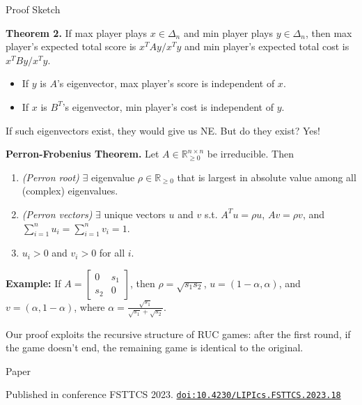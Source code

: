 \documentclass[final,20pt]{beamer}
\newlength{\colwidth}
\begin{document}
\begin{frame}[t]
\begin{columns}[t]
\begin{column}{\colwidth}
\begin{block}{Proof Sketch}


\textbf{Theorem 2.}
If max player plays $x \in \Delta_n$ and min player plays $y \in \Delta_n$,
then max player's expected total score is $x^TAy/x^Ty$
and min player's expected total cost is $x^TBy/x^Ty$.

\begin{itemize}
\item If $y$ is $A$'s eigenvector, max player's score is independent of $x$.
\item If $x$ is $B^T$'s eigenvector, min player's cost is independent of $y$.
\end{itemize}

If such eigenvectors exist, they would give us NE.
But do they exist? Yes!

\textbf{Perron-Frobenius Theorem.}
Let $A \in \mathbb{R}_{\ge 0}^{n \times n}$ be irreducible. Then
\begin{enumerate}
\item \emph{(Perron root)}
    $\exists$ eigenvalue $\rho \in \mathbb{R}_{\ge 0}$ that is largest in absolute value
    among all (complex) eigenvalues.
\item \emph{(Perron vectors)}
    $\exists$ unique vectors $u$ and $v$ s.t. $A^Tu = \rho u$, $Av = \rho v$,
    and $\sum_{i=1}^n u_i = \sum_{i=1}^n v_i = 1$.
\item $u_i > 0$ and $v_i > 0$ for all $i$.
\end{enumerate}

\textbf{Example:}
If $A = \begin{bmatrix}0 & s_1 \\ s_2 & 0\end{bmatrix}$, then
$\rho = \sqrt{s_1s_2}$, $u = (1 - \alpha, \alpha)$, and $v = (\alpha, 1 - \alpha)$,
where $\alpha = \displaystyle\frac{\sqrt{s_1}}{\sqrt{s_1} + \sqrt{s_2}}$.


Our proof exploits the recursive structure of RUC games:
after the first round, if the game doesn't end,
the remaining game is identical to the original.
\end{block}

\begin{block}{Paper}

Published in conference FSTTCS 2023.
\href{https://doi.org/10.4230/LIPIcs.FSTTCS.2023.18}{\texttt{doi:10.4230/LIPIcs.FSTTCS.2023.18}}


\end{block}
\end{column}
\end{columns}
\end{frame}
\end{document}

